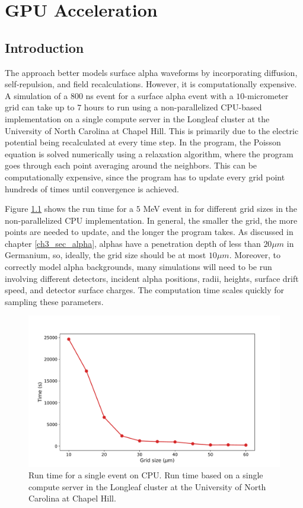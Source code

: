 \chapter{GPU Acceleration}
\label{chap4:gpu}

\section{Introduction}
The {\ehd} approach better models surface alpha waveforms by incorporating diffusion, self-repulsion, and field recalculations. However, it is computationally expensive. A simulation of a $800$ ns event for a surface alpha event with a $10$-micrometer grid can take up to $7$ hours to run using a non-parallelized CPU-based implementation on a single compute server in the Longleaf cluster at the University of North Carolina at Chapel Hill. This is primarily due to the electric potential being recalculated at every time step. In the program, the Poisson equation is solved numerically using a relaxation algorithm, where the program goes through each point averaging around the neighbors. This can be computationally expensive, since the program has to update every grid point hundreds of times until convergence is achieved. 

Figure \ref{fig:CPU_time} shows the run time for a $5$ MeV event in {\ehd} for different grid sizes in the non-parallelized CPU implementation. In general, the smaller the grid, the more points are needed to update, and the longer the program takes. As discussed in chapter \ref{ch3_sec_alpha}, alphas have a penetration depth of less than $20 \mu m$ in Germanium, so, ideally, the grid size should be at most $10 \mu m$. Moreover, to correctly model alpha backgrounds, many simulations will need to be run involving different detectors, incident alpha positions, radii, heights, surface drift speed, and detector surface charges. The computation time scales quickly for sampling these parameters.

\begin{figure}
\centering
 \includegraphics[width=0.99\linewidth]{ch4/figs/cpu_run_time.pdf}
\caption{Run time for a single {\ehd} event on CPU. Run time based on a single compute server in the Longleaf cluster at the University of North Carolina at Chapel Hill.}
\label{fig:CPU_time}
\end{figure}

